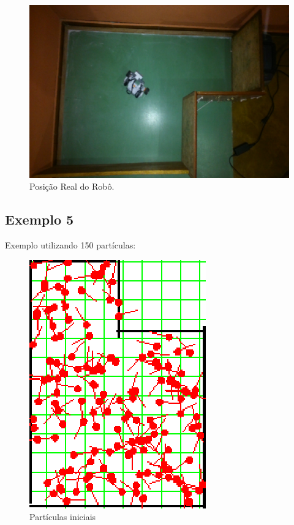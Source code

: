 \begin{figure}[H]
  \centering
  \includegraphics[scale=0.8]{figuras/cen1_ex4/real.eps}
  \caption[Posição real do Robô]{Posição Real do Robô.}
  \label{img:cen1_ex4_6}
\end{figure}

\subsection{Exemplo 5}

Exemplo utilizando 150 partículas:

\begin{figure}[H]
  \centering
  \includegraphics[scale=1]{figuras/cen1_ex5/1.eps}
  \caption[Partículas Iniciais]{Partículas iniciais}
  \label{img:cen1_ex5_1}
\end{figure}

